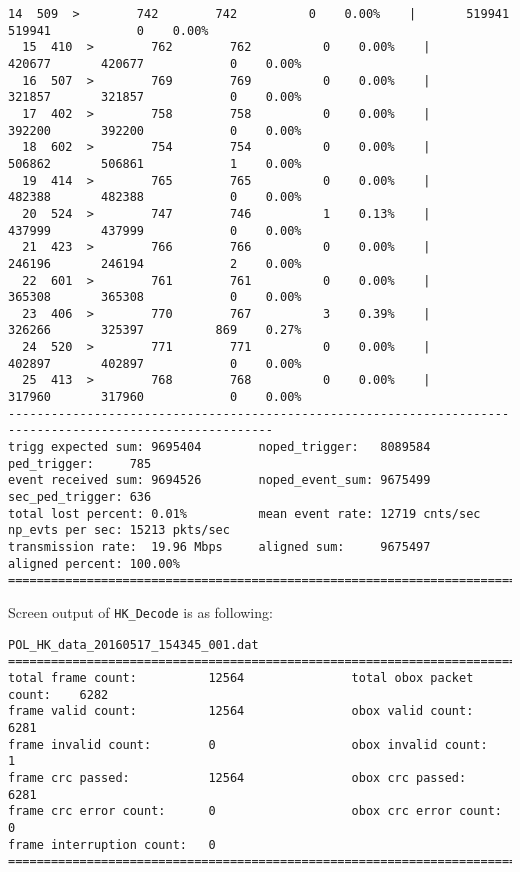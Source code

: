 \documentclass[a4paper, 12pt, onecolumn]{article}
\begin{document}
\begin{Verbatim}[fontsize=\tiny, frame=single]
  14  509  >        742        742          0    0.00%    |       519941       519941            0    0.00%
  15  410  >        762        762          0    0.00%    |       420677       420677            0    0.00%
  16  507  >        769        769          0    0.00%    |       321857       321857            0    0.00%
  17  402  >        758        758          0    0.00%    |       392200       392200            0    0.00%
  18  602  >        754        754          0    0.00%    |       506862       506861            1    0.00%
  19  414  >        765        765          0    0.00%    |       482388       482388            0    0.00%
  20  524  >        747        746          1    0.13%    |       437999       437999            0    0.00%
  21  423  >        766        766          0    0.00%    |       246196       246194            2    0.00%
  22  601  >        761        761          0    0.00%    |       365308       365308            0    0.00%
  23  406  >        770        767          3    0.39%    |       326266       325397          869    0.27%
  24  520  >        771        771          0    0.00%    |       402897       402897            0    0.00%
  25  413  >        768        768          0    0.00%    |       317960       317960            0    0.00%
-----------------------------------------------------------------------------------------------------------
trigg expected sum: 9695404        noped_trigger:   8089584             ped_trigger:     785                 
event received sum: 9694526        noped_event_sum: 9675499             sec_ped_trigger: 636                 
total lost percent: 0.01%          mean event rate: 12719 cnts/sec      np_evts per sec: 15213 pkts/sec      
transmission rate:  19.96 Mbps     aligned sum:     9675497             aligned percent: 100.00%             
===========================================================================================================
\end{Verbatim}

Screen output of \texttt{HK\_Decode} is as following:

\begin{Verbatim}[fontsize=\tiny, frame=single]
POL_HK_data_20160517_154345_001.dat
=============================================================================================
total frame count:          12564               total obox packet count:    6282                
frame valid count:          12564               obox valid count:           6281                
frame invalid count:        0                   obox invalid count:         1                   
frame crc passed:           12564               obox crc passed:            6281                
frame crc error count:      0                   obox crc error count:       0                   
frame interruption count:   0                   
=============================================================================================
\end{Verbatim}
\end{document}
